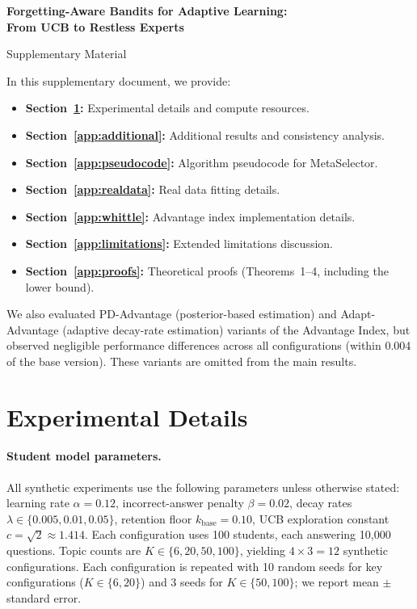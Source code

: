 \setcounter{page}{1}

\renewcommand{\thefigure}{S\arabic{figure}}
\setcounter{figure}{0}
\renewcommand{\thesection}{S\arabic{section}}
\setcounter{section}{0}
\renewcommand{\thetable}{S\arabic{table}}
\setcounter{table}{0}

\begin{center}
\Large\textbf{Forgetting-Aware Bandits for Adaptive Learning:\\From UCB to Restless Experts}\par
\vspace{1em}
\Large Supplementary Material
\end{center}

\noindent In this supplementary document, we provide:
\begin{itemize}
    \item \textbf{Section~\ref{app:details}:} Experimental details and compute resources.
    \item \textbf{Section~\ref{app:additional}:} Additional results and consistency analysis.
    \item \textbf{Section~\ref{app:pseudocode}:} Algorithm pseudocode for MetaSelector.
    \item \textbf{Section~\ref{app:realdata}:} Real data fitting details.
    \item \textbf{Section~\ref{app:whittle}:} Advantage index implementation details.
    \item \textbf{Section~\ref{app:limitations}:} Extended limitations discussion.
    \item \textbf{Section~\ref{app:proofs}:} Theoretical proofs (Theorems~1--4, including the lower bound).
\end{itemize}

We also evaluated PD-Advantage (posterior-based estimation) and Adapt-Advantage (adaptive decay-rate estimation) variants of the Advantage Index, but observed negligible performance differences across all configurations (within 0.004 of the base version). These variants are omitted from the main results.

\section{Experimental Details}
\label{app:details}

\paragraph{Student model parameters.}
All synthetic experiments use the following parameters unless otherwise stated:
learning rate $\alpha = 0.12$,
incorrect-answer penalty $\beta = 0.02$,
decay rates $\lambda \in \{0.005, 0.01, 0.05\}$,
retention floor $k_{\mathrm{base}} = 0.10$,
UCB exploration constant $c = \sqrt{2} \approx 1.414$.
Each configuration uses 100 students, each answering 10{,}000 questions.
Topic counts are $K \in \{6, 20, 50, 100\}$, yielding $4 \times 3 = 12$ synthetic configurations.
Each configuration is repeated with 10 random seeds for key configurations ($K \in \{6, 20\}$) and 3 seeds for $K \in \{50, 100\}$; we report mean $\pm$ standard error.

